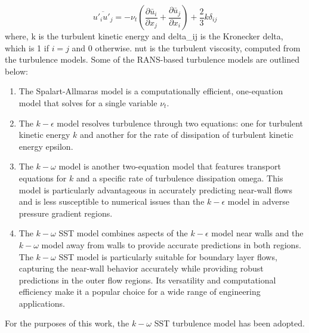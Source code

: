 \begin{equation}
\overline{u'_i u'_j} = - \nu_t \left( \frac{\partial \bar{u}_i}{\partial x_j} + \frac{\partial \bar{u}_j}{\partial x_i} \right) + \frac{2}{3} k \delta_{ij}
\end{equation}
where, \gls{k} is the turbulent kinetic energy and \gls{delta_ij} is the Kronecker delta, which is 1 if $i = j$ and 0 otherwise. \gls{nut} is the turbulent viscosity, computed from the turbulence models. Some of the RANS-based turbulence models are outlined below: 
\begin{enumerate}
  \item The Spalart-Allmaras model is a computationally efficient, one-equation model that solves for a single variable $\nu_t$.
  \item The $k-\epsilon$ model resolves turbulence through two equations: one for turbulent kinetic energy $k$ and another for the rate of dissipation of turbulent kinetic energy \gls{epsilon}. 
  \item The $k-\omega$ model is another two-equation model that features transport equations for $k$ and a specific rate of turbulence dissipation \gls{omega}. This model is particularly advantageous in accurately predicting near-wall flows and is less susceptible to numerical issues than the $k-\epsilon$ model in adverse pressure gradient regions. 
  \item The $k-\omega$  \gls{SST} model combines aspects of the $k-\epsilon$ model near walls and the $k-\omega$ model away from walls to provide accurate predictions in both regions. The $k-\omega$ SST model is particularly suitable for boundary layer flows, capturing the near-wall behavior accurately while providing robust predictions in the outer flow regions. Its versatility and computational efficiency make it a popular choice for a wide range of engineering applications.
\end{enumerate}
For the purposes of this work, the $k-\omega$ SST turbulence model has been adopted.
